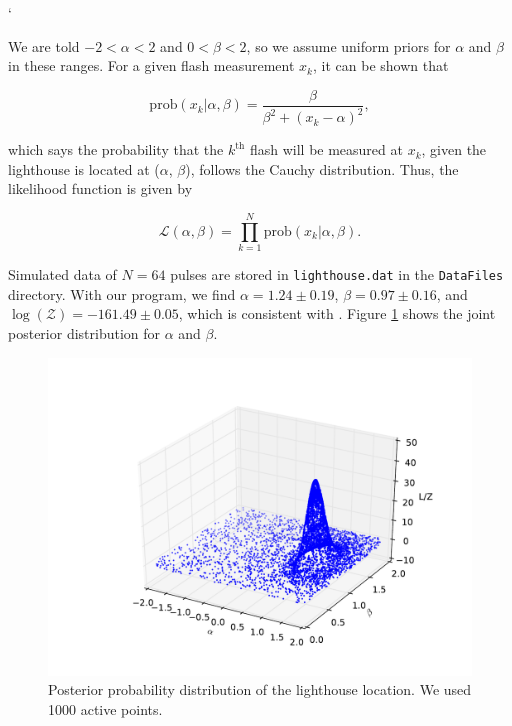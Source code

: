 `\documentclass{article}
\def\mrm{\mathrm}
\begin{document}
 \vspace{0.2cm}
 
\noindent We are told $-2 < \alpha < 2$ and $0 < \beta < 2$, so we assume uniform priors for $\alpha$ and $\beta$ in these ranges. For a given flash measurement $x_k$, it can be shown that 

\begin{equation*}
\mrm{prob}(x_k | \alpha, \beta) = \frac{\beta}{\beta^2 + (x_k - \alpha)^2},
\end{equation*}

\noindent which says the probability that the $k^\mrm{th}$ flash will be measured at $x_k$, given the lighthouse is located at ($\alpha$, $\beta$), follows the Cauchy distribution. Thus, the likelihood function is given by

\begin{equation*}
\mathcal{L}(\alpha, \beta) = \prod_{k=1}^N \mrm{prob}(x_k | \alpha, \beta).
\end{equation*}

\noindent Simulated data of $N=64$ pulses are stored in {\tt lighthouse.dat} in the {\tt DataFiles} directory. With our program, we find $\alpha = 1.24 \pm 0.19$, $\beta = 0.97 \pm 0.16$, and $\log(\mathcal{Z}) =  -161.49 \pm 0.05$, which is consistent with \cite{Siv2006}. Figure \ref{fig:lighthouse} shows the joint posterior distribution for $\alpha$ and $\beta$. 

\begin{figure}[h]
\begin{center}
\includegraphics[width=12.0cm,trim=0cm 0cm 0cm 0cm,clip=true]{lighthouse.pdf}
\caption{Posterior probability distribution of the lighthouse location. We used 1000 active points.}
\label{fig:lighthouse}
\end{center}
\end{figure}
\end{document}
